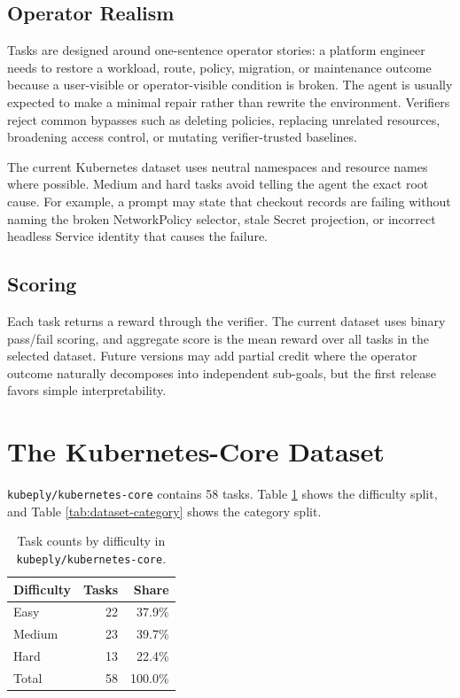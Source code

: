 \documentclass[11pt]{article}
\begin{document}
\subsection{Operator Realism}

Tasks are designed around one-sentence operator stories: a platform engineer
needs to restore a workload, route, policy, migration, or maintenance outcome
because a user-visible or operator-visible condition is broken. The agent is
usually expected to make a minimal repair rather than rewrite the environment.
Verifiers reject common bypasses such as deleting policies, replacing unrelated
resources, broadening access control, or mutating verifier-trusted baselines.

The current Kubernetes dataset uses neutral namespaces and resource names where
possible. Medium and hard tasks avoid telling the agent the exact root cause.
For example, a prompt may state that checkout records are failing without
naming the broken NetworkPolicy selector, stale Secret projection, or incorrect
headless Service identity that causes the failure.

\subsection{Scoring}

Each task returns a reward through the verifier. The current dataset uses
binary pass/fail scoring, and aggregate score is the mean reward over all tasks
in the selected dataset. Future versions may add partial credit where the
operator outcome naturally decomposes into independent sub-goals, but the first
release favors simple interpretability.

\section{The Kubernetes-Core Dataset}

\texttt{kubeply/kubernetes-core} contains 58 tasks. Table
\ref{tab:dataset-difficulty} shows the difficulty split, and Table
\ref{tab:dataset-category} shows the category split.

\begin{table}[h]
\centering
\begin{tabular}{lrr}
\toprule
Difficulty & Tasks & Share \\
\midrule
Easy & 22 & 37.9\% \\
Medium & 23 & 39.7\% \\
Hard & 13 & 22.4\% \\
\midrule
Total & 58 & 100.0\% \\
\bottomrule
\end{tabular}
\caption{Task counts by difficulty in \texttt{kubeply/kubernetes-core}.}
\label{tab:dataset-difficulty}
\end{table}
\end{document}
